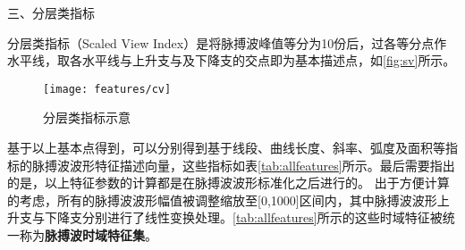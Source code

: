 三、分层类指标

分层类指标（Scaled View Index）是将脉搏波峰值等分为10份后，过各等分点作水平线，取各水平线与上升支与及下降支的交点即为基本描述点，如\autoref{fig:sv}所示。
\begin{figure}[htbp]
  \centering
  \texttt{[image: features/cv]}
  \caption{\label{fig:sv}分层类指标示意}
\end{figure}

基于以上基本点得到，可以分别得到基于线段、曲线长度、斜率、弧度及面积等指标的脉搏波波形特征描述向量，这些指标如表\autoref{tab:allfeatures}所示。最后需要指出的是，以上特征参数的计算都是在脉搏波波形标准化之后进行的。
出于方便计算的考虑，所有的脉搏波波形幅值被调整缩放至[0,1000]区间内，其中脉搏波波形上升支与下降支分别进行了线性变换处理。\autoref{tab:allfeatures}所示的这些时域特征被统一称为\textbf{脉搏波时域特征集}。
